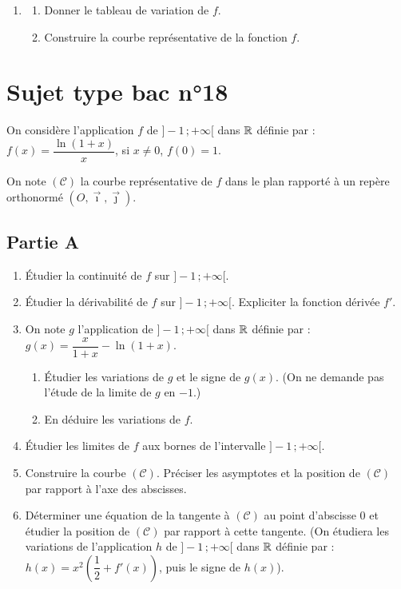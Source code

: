 \begin{enumerate}
\begin{enumerate}
		On utilisera ces valeurs approchées pour la question 4.b).
		\item On prend alors : $\displaystyle f(2) \approx \int_{\e}^{2} h(t)\,dt$. Calculer cette valeur.
	\end{enumerate}
	\item
	\begin{enumerate}
		\item Donner le tableau de variation de $f$.
		\item Construire la courbe représentative de la fonction $f$.
	\end{enumerate}
\end{enumerate}


\section*{Sujet type bac n°18}

On considère l'application $f$ de $]-1\,;+\infty[$ dans $\mathbb{R}$ définie par : $f(x)=\dfrac{\ln(1+x)}{x}$, si $x\neq0$, $f(0)=1$.

On note $(\mathscr{C})$ la courbe représentative de $f$ dans le plan rapporté à un repère orthonormé $(O,\vec{\imath},\vec{\jmath})$.

\subsection*{Partie A}

\begin{enumerate}
	\item Étudier la continuité de $f$ sur $]-1\,;+\infty[$.
	\item Étudier la dérivabilité de $f$ sur $]-1\,;+\infty[$. Expliciter la fonction dérivée $f'$.
	\item On note $g$ l'application de $]-1\,;+\infty[$ dans $\mathbb{R}$ définie par : $g(x)=\dfrac{x}{1+x}-\ln(1+x)$.
	\begin{enumerate}
		\item Étudier les variations de $g$ et le signe de $g(x)$. (On ne demande pas l'étude de la limite de $g$ en $-1$.)
		\item En déduire les variations de $f$.
	\end{enumerate}
	\item Étudier les limites de $f$ aux bornes de l'intervalle $]-1\,;+\infty[$.
	\item Construire la courbe $(\mathscr{C})$. Préciser les asymptotes et la position de $(\mathscr{C})$ par rapport à l'axe des abscisses.
	\item Déterminer une équation de la tangente à $(\mathscr{C})$ au point d'abscisse $0$ et étudier la position de $(\mathscr{C})$ par rapport à cette tangente. (On étudiera les variations de l'application $h$ de $]-1\,;+\infty[$ dans $\mathbb{R}$ définie par : $h(x)=x^2\left(\dfrac12+f'(x)\right)$, puis le signe de $h(x)$).
\end{enumerate}

